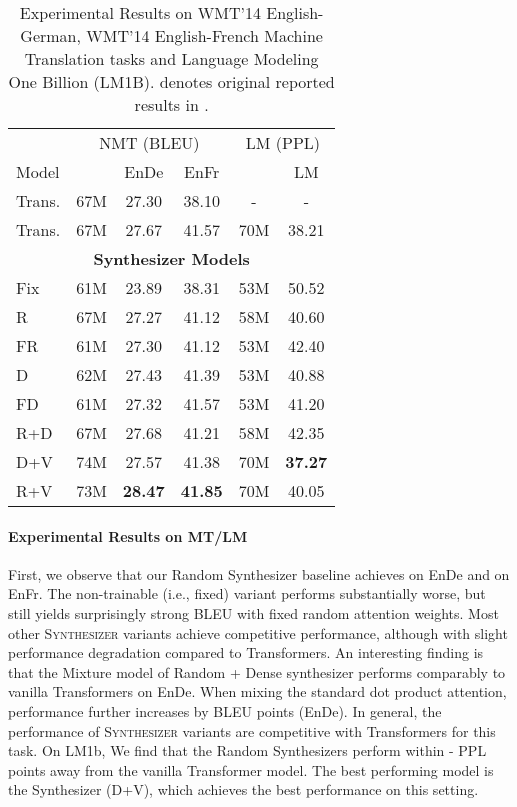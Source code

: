 \documentclass{article} \usepackage{iclr2021_conference,times}
\begin{document}
\begin{minipage}{0.54\linewidth}
\begin{table}[H]
\small
    \begin{tabular}{l|ccc|cc}
    \hline
     &    \multicolumn{3}{c}{NMT (BLEU) } & \multicolumn{2}{c}{LM (PPL)}\\
         Model &  & EnDe & EnFr &  & LM \\
         \hline
         Trans.
          & 67M &  27.30 & 38.10 & - &- \\
         Trans. & 67M & 27.67  & 41.57 & 70M & 
         38.21\\
\hline
         \multicolumn{6}{c}{\textbf{Synthesizer Models}} \\ 
         \hline
Fix  & 61M & 23.89  & 38.31 & 53M &50.52 \\
         R & 67M & 27.27 & 41.12 & 58M & 40.60 \\
         FR & 61M & 27.30 & 41.12 &53M & 42.40 \\
D  & 62M & 27.43  & 41.39 & 53M & 40.88 \\
       FD & 61M & 27.32 & 41.57  & 53M & 41.20  \\
R+D & 67M & 27.68 &  41.21 & 58M &42.35 \\ 
         D+V & 74M &27.57  & 41.38 & 70M & \textbf{37.27} \\
R+V & 73M & \textbf{28.47} &  \textbf{41.85} & 70M & 40.05\\
         \hline
    \end{tabular}
    \caption{Experimental Results on WMT'14 English-German, WMT'14 English-French Machine Translation tasks and Language Modeling One Billion (LM1B).  denotes original reported results in \citep{vaswani2017attention}.}
     \label{tab:ende}
     \end{table}
\end{minipage}
\begin{minipage}{0.5\linewidth}
\paragraph{Experimental Results on MT/LM} First, we observe that our Random Synthesizer baseline achieves  on EnDe and  on EnFr.  The non-trainable (i.e., fixed) variant performs substantially worse, but still yields surprisingly strong  BLEU with fixed random attention weights. Most other \textsc{Synthesizer} variants achieve competitive performance, although with slight performance degradation compared to Transformers. An interesting finding is that the Mixture model of Random + Dense synthesizer performs comparably to vanilla Transformers on EnDe. When mixing the standard dot product attention, performance further increases by  BLEU points (EnDe). In general, the performance of \textsc{Synthesizer} variants are competitive with Transformers for this task. On LM1b, We find that the Random Synthesizers perform within - PPL points away from the vanilla Transformer model. The best performing model is the Synthesizer (D+V), which achieves the best performance on this setting.
\end{minipage}
\end{document}
